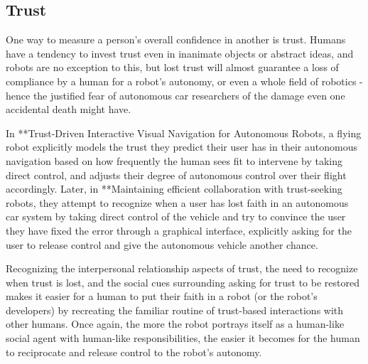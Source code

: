 \documentclass{sfuthesis}
\begin{document}


\subsection{Trust}

One way to measure a person's overall confidence in another is trust. Humans have a tendency to invest trust even in inanimate objects or abstract ideas, and robots are no exception to this, but lost trust will almost guarantee a loss of compliance by a human for a robot's autonomy, or even a whole field of robotics - hence the justified fear of autonomous car researchers of the damage even one accidental death might have.

In **Trust-Driven Interactive Visual Navigation for Autonomous Robots, a flying robot explicitly models the trust they predict their user has in their autonomous navigation based on how frequently the human sees fit to intervene by taking direct control, and adjusts their degree of autonomous control over their flight accordingly. Later, in **Maintaining efficient collaboration with trust-seeking robots, they attempt to recognize when a user has lost faith in an autonomous car system by taking direct control of the vehicle and try to convince the user they have fixed the error through a graphical interface, explicitly asking for the user to release control and give the autonomous vehicle another chance. 

Recognizing the interpersonal relationship aspects of trust, the need to recognize when trust is lost, and the social cues surrounding asking for trust to be restored makes it easier for a human to put their faith in a robot (or the robot's developers) by recreating the familiar routine of trust-based interactions with other humans. Once again, the more the robot portrays itself as a human-like social agent with human-like responsibilities, the easier it becomes for the human to reciprocate and release control to the robot's autonomy.


\end{document}
